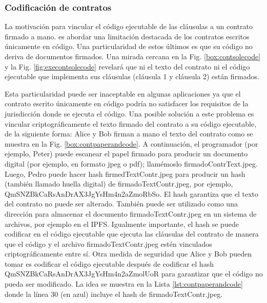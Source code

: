 \documentclass[12pt]{report} %
\begin{document}
\subsubsection{Codificación de contratos}

La motivación para vincular el código ejecutable de las cláusulas a un contrato firmado a mano. es abordar una limitación destacada de los contratos escritos únicamente en código. Una particularidad de estos últimos es que su código no  deriva de documentos firmados. Una mirada cercana en la Fig. \ref{box:contsolecode} y la Fig. \ref{fig:execontsolecode}  revelará que ni el texto del contrato ni el código ejecutable  que implementa sus cláusulas (cláusula 1 y cláusula 2) están firmados.



Esta particularidad puede ser inaceptable en algunas aplicaciones ya que el contrato escrito únicamente en código podría no satisfacer los requisitos de la jurisdicción donde se ejecuta el código. Una posible solución a este problema es vincular criptográficamente el texto firmado del contrato a su código ejecutable, de la siguiente forma: Alice y Bob firman a mano el texto del contrato como se muestra en la Fig. \ref{box:contpaperandcode}. A continuación, el programador (por ejemplo, Peter) puede escanear el papel firmado para producir un documento digital (por ejemplo, en formato jpeg o pdf); llamémoslo firmadoContrText.jpeg. Luego, Pedro puede hacer hash firmedTextContr.jpeg para producir un hash (también llamado huella digital) de
firmadoTextContr.jpeg, por ejemplo, QmSNZBkCaRsAnDrAX3JgYsHm4n2aZmoRbSo. El hash garantiza que el texto del contrato no puede ser alterado. También puede ser utilizado como una dirección para almacenar el documento firmadoTextContr.jpeg en un sistema de archivos, por ejemplo en el IPFS. Igualmente importante, el hash se puede codificar en el código ejecutable que ejecuta las cláusulas del contrato de manera que el código y el archivo firmadoTextContr.jpeg estén vinculados criptográficamente entre sí. Otra medida de seguridad que Alice y Bob pueden tomar es codificar el código ejecutable después de codificar el hash QmSNZBkCaRsAnDrAX3JgYsHm4n2aZmolUoR para garantizar que el código no pueda ser modificado. La idea se muestra en la Lista \ref{lst:contpaperandcode} donde la línea 30 (en azul) incluye el hash de firmadoTextContr.jpeg.
\end{document}
